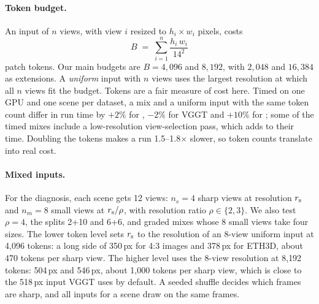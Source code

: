 \paragraph{Token budget.}
An input of $n$ views, with view $i$ resized to $h_i\times w_i$ pixels, costs
\begin{equation}
  B \;=\; \sum_{i=1}^{n} \frac{h_i\, w_i}{14^2}
  \label{eq:budget}
\end{equation}
patch tokens. Our main budgets are $B{=}4{,}096$ and $8{,}192$, with $2{,}048$ and $16{,}384$ as extensions. A \emph{uniform} input with $n$ views uses the largest resolution at which all $n$ views fit the budget. Tokens are a fair measure of cost here. Timed on one GPU and one scene per dataset, a mix and a uniform input with the same token count differ in run time by $+2\%$ for \pithree, $-2\%$ for VGGT and $+10\%$ for \dathree; some of the timed \dathree mixes include a low-resolution view-selection pass, which adds to their time. Doubling the tokens makes a run 1.5--1.8$\times$ slower, so token counts translate into real cost.

\paragraph{Mixed inputs.}
For the diagnosis, each scene gets 12 views: $n_s{=}4$ sharp views at resolution $r_{\mathrm{s}}$ and $n_m{=}8$ small views at $r_{\mathrm{s}}/\rho$, with resolution ratio $\rho\in\{2,3\}$. We also test $\rho{=}4$, the splits 2+10 and 6+6, and graded mixes whose 8 small views take four sizes. The lower token level sets $r_{\mathrm{s}}$ to the resolution of an 8-view uniform input at 4{,}096 tokens: a long side of 350\,px for 4:3 images and 378\,px for ETH3D, about 470 tokens per sharp view. The higher level uses the 8-view resolution at 8{,}192 tokens: 504\,px and 546\,px, about 1{,}000 tokens per sharp view, which is close to the 518\,px input VGGT uses by default. A seeded shuffle decides which frames are sharp, and all inputs for a scene draw on the same frames.

